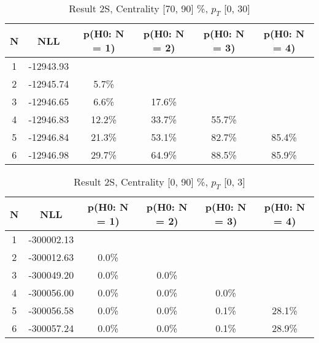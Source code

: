 \begin{table}[htb]
	\begin{center}
	\caption{Result 2S, Centrality [70, 90] \%, $p_{T}$ [0, 30] \GeV
}
{\footnotesize\renewcommand{\arraystretch}{1.4}
		\begin{tabular}{cc||>{\columncolor[gray]{0.8}}cccc}
			N & NLL & p(H0: N = 1) & p(H0: N = 2) & p(H0: N = 3) & p(H0: N = 4)\\ 
		\hline
1 & -12943.93 & & & &\\
2 & -12945.74 & 5.7\% & & &\\
3 & -12946.65 & 6.6\% & 17.6\% & &\\
4 & -12946.83 & 12.2\% & 33.7\% & 55.7\% &\\
5 & -12946.84 & 21.3\% & 53.1\% & 82.7\% & 85.4\%\\
6 & -12946.98 & 29.7\% & 64.9\% & 88.5\% & 85.9\% \\
	\end{tabular}
		\label{tab:lab}
	}
	\end{center}\end{table}

\begin{table}[htb]
	\begin{center}
	\caption{Result 2S, Centrality [0, 90] \%, $p_{T}$ [0, 3] \GeV
}
{\footnotesize\renewcommand{\arraystretch}{1.4}
		\begin{tabular}{cc||ccc>{\columncolor[gray]{0.8}}c}
			N & NLL & p(H0: N = 1) & p(H0: N = 2) & p(H0: N = 3) & p(H0: N = 4)\\ 
		\hline
1 & -300002.13 & & & &\\
2 & -300012.63 & 0.0\% & & &\\
3 & -300049.20 & 0.0\% & 0.0\% & &\\
4 & -300056.00 & 0.0\% & 0.0\% & 0.0\% &\\
5 & -300056.58 & 0.0\% & 0.0\% & 0.1\% & 28.1\%\\
6 & -300057.24 & 0.0\% & 0.0\% & 0.1\% & 28.9\% \\
	\end{tabular}
		\label{tab:lab}
	}
	\end{center}\end{table}

